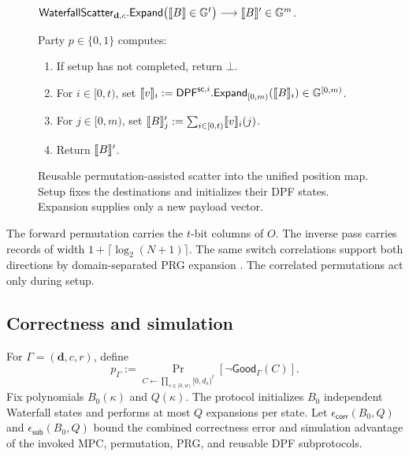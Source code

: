 \begin{figure}[H]
{\begin{minipage}{.95\textwidth}
\par\medskip
\noindent
$\mathsf{WaterfallScatter}_{\mathbf d,c}.\mathsf{Expand}
 \bigl(\share B\in\mathbb G^t\bigr)
 \longrightarrow\share B'\in\mathbb G^m$.
\par\smallskip
Party $p\in\{0,1\}$ computes:

\begin{enumerate}[nosep]
  \item If setup has not completed, return $\bot$.
  \item For $i\in[0,t)$, set
  $\share v_i:=\mathsf{DPF}^{\mathsf{sc},i}.\mathsf{Expand}_{[0,m)}(\share B_i)
  \in\mathbb G^{[0,m)}$.
  \item For $j\in[0,m)$, set
  $\share B'_j:=\sum_{i\in[0,t)}\share v_i(j)$.
  \item Return $\share B'$.
\end{enumerate}
\end{minipage}}
\caption{Reusable permutation-assisted scatter into the unified position map.
Setup fixes the destinations and initializes their DPF states.  Expansion
supplies only a new payload vector.\label{fig:waterfallScatterProtocol}}
\end{figure}

The forward permutation carries the $t$-bit columns of $O$.  The inverse pass
carries records of width $1+\lceil\log_2(N+1)\rceil$.  The same switch
correlations support both directions by domain-separated PRG expansion
\cite{permCor}.  The correlated permutations act only during setup.

\subsection{Correctness and simulation}\label{sec:waterfallSecurity}

For $\Gamma=(\mathbf d,c,r)$, define
\begin{equation}\label{eq:waterfall-generator-rejection}
 p_\Gamma:=\Pr_{C\gets\prod_{s\in[0,w)}[0,d_s)^t}
 [\neg\mathsf{Good}_\Gamma(C)].
\end{equation}
Fix polynomials $B_0(\kappa)$ and $Q(\kappa)$.  The protocol initializes
$B_0$ independent Waterfall states and performs at most $Q$ expansions per
state.  Let $\epsilon_{\mathsf{corr}}(B_0,Q)$ and
$\epsilon_{\mathsf{sub}}(B_0,Q)$ bound the combined correctness error and
simulation advantage of the invoked MPC, permutation, PRG, and reusable DPF
subprotocols.

